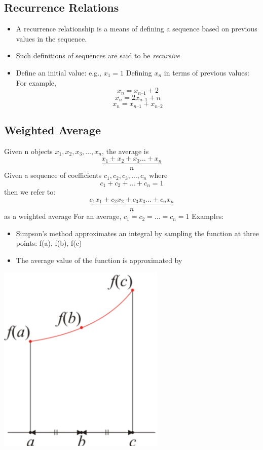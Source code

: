 \documentclass[11pt]{article}
\theoremstyle{definition}
\begin{document}
\newpage
\subsection{Recurrence Relations}
\begin{itemize}[label={--}]
\item A recurrence relationship is a means of defining a sequence based on previous values in the sequence.
\item Such definitions of sequences are said to be \textit{recursive}
\item
\begin{shaded}
Define an initial value: e.g., $x_1 = 1$
\newline
Defining $x_n$ in terms of previous values:
For example,
	  		$$x_n = x_{n – 1} + 2$$
			$$x_n = 2x_{n – 1} + n$$
			$$x_n = x_{n – 1} + x_{n – 2}$$
\end{shaded}
\end{itemize}
\subsection{Weighted Average}
Given n objects $x_1, x_2, x_3, \ldots, x_n$, the average is
$$\frac{x_1+x_2+x_3\ldots+x_n}{n}$$
	Given a sequence of coefficients $c_1 , c_2 , c_3 ,\ldots, c_n$ where
$$c_1 + c_2 + \ldots + c_n = 1$$
then we refer to:
$$\frac{c_1x_1+c_2x_2+c_3x_3\ldots+c_nx_n}{n}$$	as a weighted average \newline
For an average, $c_1 = c_2 = \ldots = c_n = 1$
\newline
Examples:
\newline
\begin{minipage}{0.4\textwidth}
\begin{itemize}[label={--}]
\item Simpson’s method approximates an integral by sampling the function at three points:  f(a), f(b), f(c)
\item The average value of the function is approximated by
\end{itemize}
\end{minipage}%
%
\begin{minipage}{0.4\textwidth}
\begin{center}
    \includegraphics[width=0.6\textwidth]{simmons}
    \label{img:g}
\end{center}
\end{minipage}
\end{document}
